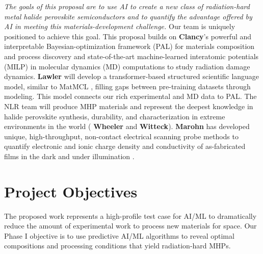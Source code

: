 \documentclass[pgs]{DOE}
\newcommand{\highlight}[1]{{\noindent \bf \color{RawSienna} #1}}
\newcommand{\mnote}[1]{{\marginpar{\color{red} #1}}}
\newcommand{\todo}[2]{{[\color{RawSienna} #1] \color{red} #2}}
\newcommand{\draft}[1]{{\color{TealBlue} #1}}
\renewcommand{\mnote}[1]{}
\renewcommand{\todo}[2]{}
\begin{document}
\textit{The goals of this proposal are to use AI to create a new class of radiation-hard metal halide perovskite semiconductors and to quantify the advantage offered by AI in meeting this materials-development challenge.}
Our team is uniquely positioned to achieve this goal. This proposal builds on \highlight{Clancy}'s powerful and interpretable Bayesian-optimization framework (PAL) \cite{Priyadarshini2024,Raguraman2024jun,Raguraman2025oct} for materials composition and process discovery and state-of-the-art machine-learned interatomic potentials (MILP) \cite{cao2025migrationprobegeneralizablebenchmark}
in molecular dynamics (MD) computations to study radiation damage dynamics.
\highlight{Lawler} will develop a transformer-based structured scientific language model, similar to MatMCL \cite{wu2025versatile}, filling gaps between pre-training datasets through modeling.
This model connects our rich experimental and MD data to PAL. 
The NLR team will produce MHP materials and represent the deepest knowledge in halide perovskite synthesis, durability, and characterization in extreme environments in the world (\highlight{Wheeler} and \highlight{Witteck})\cite{noauthor_nlr_2026,witteck_reducing_2024, prince_sustainability_2025,doi:10.1021/jacs.8b04984}.
\highlight{Marohn} has developed unique, high-throughput, non-contact electrical scanning probe methods to quantify electronic and ionic charge density and conductivity of as-fabricated films in the dark and under illumination \cite{Tirmzi2017jan,Dwyer2017jun,Tirmzi2019jan,Tirmzi2020jun,Dwyer2019jun}. 


\section{Project Objectives}
\mnote{0.5 pages}
% 
%
The proposed work represents a high-profile test case for AI/ML to dramatically reduce the amount of experimental work to process new materials for space. 
Our Phase I objective is to use predictive AI/ML algorithms to reveal optimal compositions and processing conditions that yield radiation-hard MHPs. 
\end{document}
